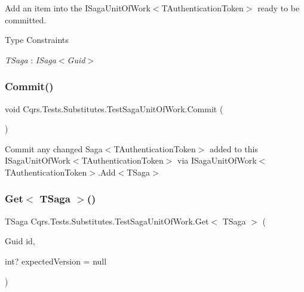 Add an item into the I\+Saga\+Unit\+Of\+Work$<$\+T\+Authentication\+Token$>$ ready to be committed. 

\begin{Desc}
\item[Type Constraints]\begin{description}
\item[{\em T\+Saga} : {\em I\+Saga$<$Guid$>$}]\end{description}
\end{Desc}
\mbox{\label{classCqrs_1_1Tests_1_1Substitutes_1_1TestSagaUnitOfWork_ab50323c2f6a97c5f7eefa0d718dd7053}} 
\subsubsection{\texorpdfstring{Commit()}{Commit()}}
{\footnotesize\ttfamily void Cqrs.\+Tests.\+Substitutes.\+Test\+Saga\+Unit\+Of\+Work.\+Commit (\begin{DoxyParamCaption}{ }\end{DoxyParamCaption})}



Commit any changed Saga$<$\+T\+Authentication\+Token$>$ added to this I\+Saga\+Unit\+Of\+Work$<$\+T\+Authentication\+Token$>$ via I\+Saga\+Unit\+Of\+Work$<$\+T\+Authentication\+Token$>$.\+Add$<$\+T\+Saga$>$ 

\mbox{\label{classCqrs_1_1Tests_1_1Substitutes_1_1TestSagaUnitOfWork_a5b301e0f8efa469bcd164f032fffad98}} 
\subsubsection{\texorpdfstring{Get$<$ T\+Saga $>$()}{Get< TSaga >()}}
{\footnotesize\ttfamily T\+Saga Cqrs.\+Tests.\+Substitutes.\+Test\+Saga\+Unit\+Of\+Work.\+Get$<$ T\+Saga $>$ (\begin{DoxyParamCaption}\item[{Guid}]{id,  }\item[{int?}]{expected\+Version = {\ttfamily null} }\end{DoxyParamCaption})}



